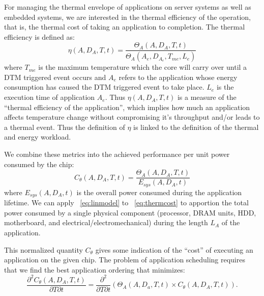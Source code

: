 For managing the thermal envelope of applications on server systems as
well as embedded systems, we are interested in the thermal efficiency of
the operation, that is, the thermal cost of taking an application to
completion. The thermal efficiency is defined as:
\begin{equation}
\label{eq:thermeff}
\eta(A, D_{A},T,t) = \frac{\Theta_A(A,D_{A}, T,t)}{\Theta_A(A_e,D_{A_{e}}, T_{me}, L_{e})}
\end{equation}
where $T_{me}$ is the maximum temperature which the core will carry
over until a DTM triggered event occurs and $A_e$ refers to the application
whose energy consumption has caused the DTM triggered event to take
place. $L_{e}$ is the execution time of application $A_e$. Thus
$\eta(A, D_{A},T,t)$ is a measure of the ``thermal efficiency of the
application'', which implies how much an application affects temperature
change without compromising it's throughput and/or leads to a thermal
event. Thus the definition of $\eta$ is linked to the definition of the
thermal and energy workload.

We combine these metrics into the achieved performance per unit power
consumed by the chip:
\begin{equation}
\label{eq:thermcost}
C_{\theta}(A, D_{A}, T,t)=\frac{\Theta_A(A,D_{A}, T, t)}{E_{sys}(A,D_{A},t)}
\end{equation}
where $E_{sys}(A,D_{A},t)$ is the overall power consumed during the
application lifetime.  We can apply \equationname~\ref{eq:linmodel} to
\equationname~\ref{eq:thermcost} to apportion the total power consumed
by a single physical component (processor, DRAM units, HDD, motherboard,
and electrical/electromechanical) during the length $L_{A}$ of the
application.

This normalized quantity $C_\theta$ gives some indication of the
``cost'' of executing an application on the given chip.  The problem of
application scheduling requires that we find the best application
ordering that minimizes:
\begin{equation}
\label{eq:thermopt}
  \frac{\partial^{2} C_{\theta}(A, D_{A}, T, t)}{\partial T \partial t}
  =
  \frac{\partial^{2}}{\partial T \partial t}
  \left(
  \Theta_{A}(A,D_{a},T,t)
  \times
  C_{\theta}(A, D_{A}, T,t)
  \right).
\end{equation}

